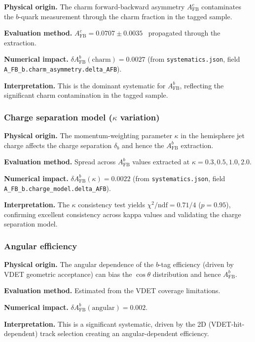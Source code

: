 \documentclass[11pt,a4paper]{article}
\begin{document}
\textbf{Physical origin.} The charm forward-backward asymmetry $A_\mathrm{FB}^c$ contaminates
the $b$-quark measurement through the charm fraction in the tagged sample.

\textbf{Evaluation method.} $A_\mathrm{FB}^c = 0.0707 \pm 0.0035$~\cite{LEP:EWWG:2005}
propagated through the extraction.

\textbf{Numerical impact.}
$\delta A_\mathrm{FB}^b(\mathrm{charm}) = 0.0027$
(from \texttt{systematics.json}, field \texttt{A\_FB\_b.charm\_asymmetry.delta\_AFB}).

\textbf{Interpretation.} This is the dominant systematic for $A_\mathrm{FB}^b$,
reflecting the significant charm contamination in the tagged sample.

\subsubsection{Charge separation model ($\kappa$ variation)}
\label{sec:syst_kappa}

\textbf{Physical origin.} The momentum-weighting parameter $\kappa$ in the hemisphere
jet charge affects the charge separation $\delta_b$ and hence the $A_\mathrm{FB}^b$ extraction.

\textbf{Evaluation method.} Spread across $A_\mathrm{FB}^b$ values extracted at
$\kappa = 0.3, 0.5, 1.0, 2.0$.

\textbf{Numerical impact.}
$\delta A_\mathrm{FB}^b(\kappa) = 0.0022$
(from \texttt{systematics.json}, field \texttt{A\_FB\_b.charge\_model.delta\_AFB}).

\textbf{Interpretation.} The $\kappa$ consistency test yields $\chi^2/\mathrm{ndf} = 0.71/4$
($p = 0.95$), confirming excellent consistency across kappa values and validating the
charge separation model.

\subsubsection{Angular efficiency}
\label{sec:syst_angular}

\textbf{Physical origin.} The angular dependence of the $b$-tag efficiency (driven by
VDET geometric acceptance) can bias the $\cos\theta$ distribution and hence $A_\mathrm{FB}^b$.

\textbf{Evaluation method.} Estimated from the VDET coverage limitations.

\textbf{Numerical impact.}
$\delta A_\mathrm{FB}^b(\mathrm{angular}) = 0.002$.

\textbf{Interpretation.} This is a significant systematic, driven by the 2D (VDET-hit-dependent)
track selection creating an angular-dependent efficiency.
\end{document}
